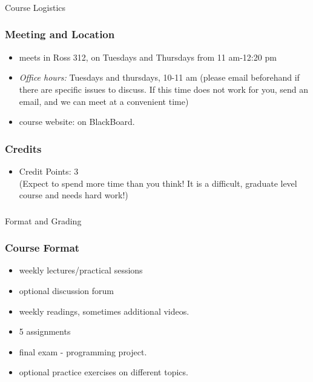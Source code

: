 \documentclass{beamer}
\begin{document}
\begin{frame}
\frametitle{}
\begin{center}
\Large Course Logistics
\end{center}
\end{frame}

\begin{frame}
\frametitle{Meeting and Location}
\begin{itemize}
\item  meets in Ross 312, on Tuesdays and Thursdays from 11 am-12:20 pm
\item \textit{Office hours:} Tuesdays and thursdays, 10-11 am (please email beforehand if there are specific issues to discuss. If this time does not work for you, send an email, and we can meet at a convenient time)
\item course website: on BlackBoard.
\end{itemize}
\end{frame}

\begin{frame}
\frametitle{Credits}
\begin{itemize}\vspace*{-.8\baselineskip}\itemsep0ex
\item Credit Points: 3
\\ (Expect to spend more time than you think! It is a difficult, graduate level course and needs hard work!)
\end{itemize}
\end{frame}

\begin{frame}
\frametitle{}
\begin{center}
Format and Grading
\end{center}
\end{frame}

\begin{frame}
\frametitle{Course Format}
\begin{itemize}\itemsep2ex
\item weekly lectures/practical sessions
\item optional discussion forum
\item weekly readings, sometimes additional videos.
\item 5 assignments
\item final exam - programming project.
\item optional practice exercises on different topics.
\end{itemize}
\end{frame}
\end{document}

